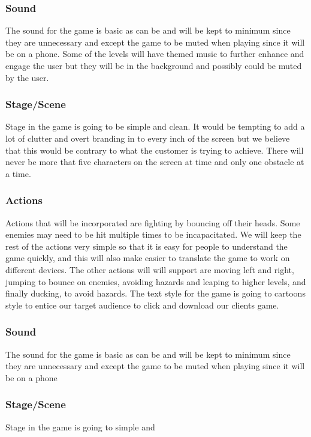 \documentclass{article}
\begin{document}
\subsubsection{Sound}
The sound for the game is basic as can be and will be kept to minimum since they are unnecessary and except the game to be muted when playing since it will be on a phone. Some of the levels will have themed music to further enhance and engage the user but they will be in the background and possibly could be muted by the user.

\subsubsection{Stage/Scene}
Stage in the game is going to be simple and clean. It would be tempting to add a lot of clutter and overt branding in to every inch of the screen but we believe that this would be contrary to what the customer is trying to achieve. There will never be more that five characters on the screen at time and only one obstacle at a time.


\subsubsection{Actions}
Actions that will be incorporated are fighting by bouncing off their heads. Some enemies may need to be hit multiple times to be incapacitated. We will keep the rest of the actions very simple so that it is easy for people to understand the game quickly, and this will also make easier to translate the game to work on different devices. The other actions will will support are moving left and right, jumping to bounce on enemies, avoiding hazards and leaping to higher levels, and finally ducking, to avoid hazards.
The text style for the game is going to cartoons style to entice our target audience to click and download our clients game. 

\subsubsection{Sound}
The sound for the game is basic as can be and will be kept to minimum since they are unnecessary and except the game to be muted when playing since it will be on a phone

\subsubsection{Stage/Scene}
Stage in the game is going to simple and 
\end{document}
